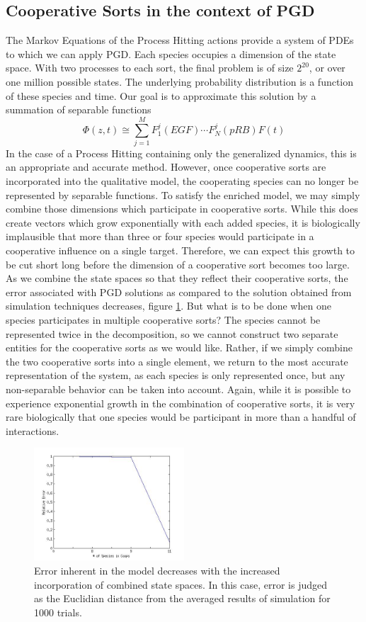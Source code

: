 \documentclass{article}
\begin{document}
\subsection{Cooperative Sorts in the context of PGD}
The Markov Equations of the Process Hitting actions provide a system of PDEs to which we can apply PGD. Each species occupies a dimension of the state space. With two processes to each sort, the final problem is of size $2^{20}$, or over one million possible states. The underlying probability distribution is a function of these species and time. Our goal is to approximate this solution by a summation of separable functions 
\[
 \Phi(z,t)\cong \sum_{j=1}^{M}F_1^j(EGF)\cdots F_N^j(pRB) F(t)
\]
 In the case of a Process Hitting containing only the generalized dynamics, this is an appropriate and accurate method. However, once cooperative sorts are incorporated into the qualitative model, the cooperating species can no longer be represented by separable functions. To satisfy the enriched model, we may simply combine those dimensions which participate in cooperative sorts. While this does create vectors which grow exponentially with each added species, it is biologically implausible that more than three or four species would participate in a cooperative influence on a single target. Therefore, we can expect this growth to be cut short long before the dimension of a cooperative sort becomes too large. As we combine the state spaces so that they reflect their cooperative sorts, the error associated with PGD solutions as compared to the solution obtained from simulation techniques decreases, figure \ref{error_coop}. But what is to be done when one species participates in multiple cooperative sorts? The species cannot be represented twice in the decomposition, so we cannot construct two separate entities for the cooperative sorts as we would like. Rather, if we simply combine the two cooperative sorts into a single element, we return to the most accurate representation of the system, as each species is only represented once, but any non-separable behavior can be taken into account. Again, while it is possible to experience exponential growth in the combination of cooperative sorts, it is very rare biologically that one species would be participant in more than a handful of interactions.\\
 
\begin{figure}[h!]
\centering
 \includegraphics[width=0.5\textwidth]{errors.jpg}
 \caption{Error inherent in the model decreases with the increased incorporation of combined state spaces. In this case, error is judged as the Euclidian distance from the averaged results of simulation for 1000 trials.}
 \label{error_coop}
\end{figure}
\end{document}
